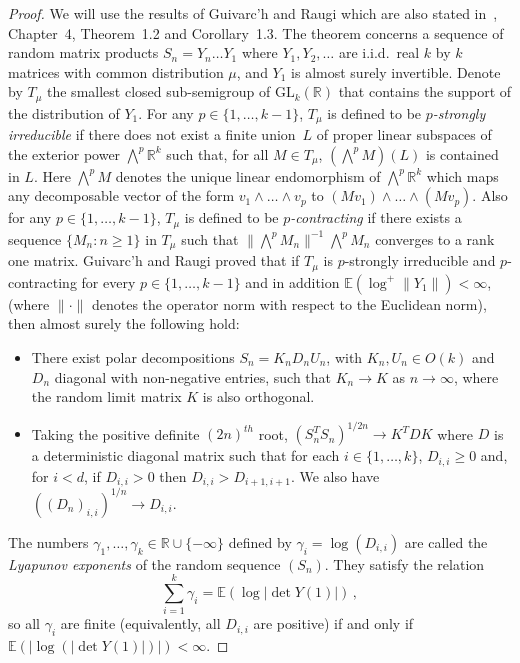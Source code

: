 \documentclass[12pt]{article}
\newcommand{\1}{\mathbf{1}}
\begin{document}
\begin{proof}
We will use the results of Guivarc'h and Raugi \cite{GR} which are also stated in~\cite{BougerolLacroix}, Chapter~4, Theorem~1.2 and Corollary~1.3. The theorem concerns a sequence of random matrix products $S_n = Y_n \dots Y_1$ where $Y_1, Y_2, \dots $ are i.i.d.~real $k$ by $k$ matrices with common distribution $\mu$, and $Y_1$ is almost surely invertible. Denote by $T_\mu$ the smallest closed sub-semigroup of $\mathrm{GL}_{k}(\mathbb{R})$ that contains the support of the distribution of $Y_1$. For any $p \in \{1, \dots, k-1\}$, $T_\mu$ is defined to be \emph{$p$-strongly irreducible} if there does not exist a finite union~$L$ of proper linear subspaces of the exterior power $\bigwedge^p \mathbb{R}^k$ such that, for all $M \in T_\mu$, $\left(\bigwedge^p M \right)(L)$ is contained in $L$. Here $\bigwedge^p M$ denotes the unique linear endomorphism of $\bigwedge^p \mathbb{R}^k$ which maps any decomposable vector of the form $v_1 \wedge \dots \wedge v_p$ to $(Mv_1) \wedge \dots \wedge (M v_p)$. Also for any $p \in \{1, \dots, k-1\}$, $T_\mu$ is defined to be \emph{$p$-contracting} if there exists a sequence $\{M_n: n \ge 1\}$ in $T_\mu$ such that $ \| \bigwedge^p M_n\|^{-1} \bigwedge^p M_n$ converges to a rank one matrix. Guivarc'h and Raugi proved that if $T_\mu$ is $p$-strongly irreducible and $p$-contracting for every $p \in \{1, \dots, k-1\}$ and in addition $\mathbb{E}(\log^{+} \| Y_1\|) < \infty$, (where $\|\cdot\|$ denotes the operator norm with respect to the Euclidean norm), then almost surely the following hold:
\begin{itemize}
\item There exist polar decompositions $S_n = K_n D_n U_n$, with $K_n, U_n \in O(k)$ and $D_n$ diagonal with non-negative entries, such that $K_n \to K$ as $n \to \infty$, where the random limit matrix $K$ is also orthogonal.
\item Taking the positive definite $(2n)^{th}$ root, $\left(S_n^T S_n\right)^{1/2n} \to K^T D K$ where $D$ is a deterministic diagonal matrix such that for each $i \in \{1, \dots, k\}$, $D_{i,i} \ge 0$ and, for $i < d$, if $D_{i,i} > 0$ then $D_{i,i} > D_{i+1,i+1}$. 
We also have $\left(\left(D_n\right)_{i,i}\right)^{1/n} \to D_{i,i}$. 
\end{itemize}
The numbers $\gamma_1, \dots, \gamma_k \in \mathbb{R} \cup \{-\infty\}$ defined by $\gamma_i = \log(D_{i,i})$ are called the \emph{Lyapunov exponents} of the random sequence $\left(S_n\right)$. They satisfy the relation
$$ 
\sum_{i=1}^k \gamma_i = \mathbb{E} (\log | \det Y(1) |)\,,
$$ 
so all $\gamma_i$ are finite (equivalently, all $D_{i,i}$ are positive) if and only if $\mathbb{E}(|\log(|\det Y(1)|)|) < \infty$.


\end{proof}
\end{document}
